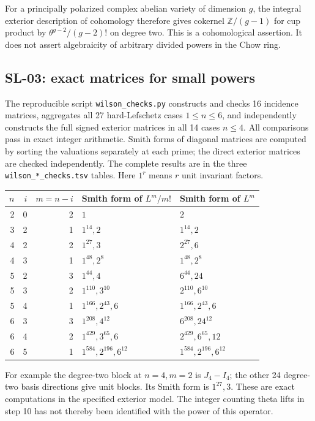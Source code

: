 \documentclass[11pt,a4paper]{article}
\theoremstyle{remark}
\begin{document}
For a principally polarized complex abelian variety of dimension $g$,
the integral exterior description of cohomology therefore gives cokernel
$\mathbb Z/(g-1)$ for cup product by $\theta^{g-2}/(g-2)!$ on degree
two.  This is a cohomological assertion.  It does not assert algebraicity
of arbitrary divided powers in the Chow ring.

\subsection{SL-03: exact matrices for small powers}
\label{sl:computations}

The reproducible script \texttt{wilson\_checks.py} constructs and checks
16 incidence matrices, aggregates all 27 hard-Lefschetz cases $1\le n\le6$,
and independently constructs the full signed exterior matrices in all 14
cases $n\le4$.  All comparisons pass in exact integer arithmetic.  Smith
forms of diagonal matrices are computed by sorting the valuations separately
at each prime; the direct exterior matrices are checked independently.
The complete results are in the three \texttt{wilson\_*\_checks.tsv}
tables.  Here $1^r$ means $r$ unit invariant factors.

\begin{center}
\begin{tabular}{rrrll}
\toprule
$n$&$i$&$m=n-i$&Smith form of $L^m/m!$&Smith form of $L^m$\\
\midrule
2&0&2&$1$&$2$\\
3&2&1&$1^{14},2$&$1^{14},2$\\
4&2&2&$1^{27},3$&$2^{27},6$\\
4&3&1&$1^{48},2^8$&$1^{48},2^8$\\
5&2&3&$1^{44},4$&$6^{44},24$\\
5&3&2&$1^{110},3^{10}$&$2^{110},6^{10}$\\
5&4&1&$1^{166},2^{43},6$&$1^{166},2^{43},6$\\
6&3&3&$1^{208},4^{12}$&$6^{208},24^{12}$\\
6&4&2&$1^{429},3^{65},6$&$2^{429},6^{65},12$\\
6&5&1&$1^{584},2^{196},6^{12}$&$1^{584},2^{196},6^{12}$\\
\bottomrule
\end{tabular}
\end{center}

For example the degree-two block at $n=4,m=2$ is $J_4-I_4$; the other
24 degree-two basis directions give unit blocks.  Its Smith form is
$1^{27},3$.  These are exact computations in the specified exterior model.
The integer counting theta lifts in step 10 has not thereby been identified
with the power of this operator.
\end{document}
